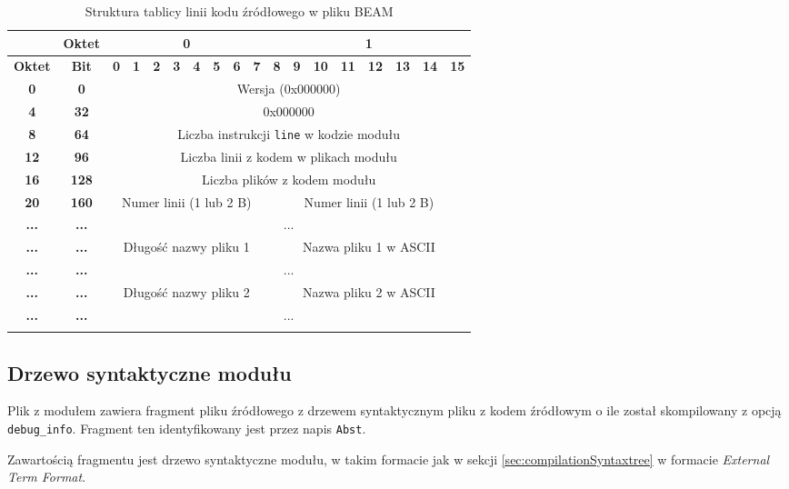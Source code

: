\begin{longtable}{|c|c|c|c|c|c|c|c|c|c|c|c|c|c|c|c|c|c|}
\hline
         & \textbf{Oktet} & \multicolumn{8}{|c|}{\textbf{0}} & \multicolumn{8}{|c|}{\textbf{1}} \\
\hline
\textbf{Oktet} & \textbf{Bit} & \textbf{0} & \textbf{1} & \textbf{2} & \textbf{3} & \textbf{4} & \textbf{5} & \textbf{6} & \textbf{7} & \textbf{8} & \textbf{9} & \textbf{10} & \textbf{11} & \textbf{12} & \textbf{13} & \textbf{14} & \textbf{15}\\
\hline
\textbf{0} & \textbf{0} & \multicolumn{16}{|c|}{Wersja (0x000000)} \\[3ex]
\hline
\textbf{4} & \textbf{32} & \multicolumn{16}{|c|}{0x000000}\\[3ex]
\hline
\textbf{8} & \textbf{64} & \multicolumn{16}{|c|}{Liczba instrukcji \texttt{line} w kodzie modułu} \\[3ex]
\hline
\textbf{12} & \textbf{96} & \multicolumn{16}{|c|}{Liczba linii z kodem w plikach modułu}\\[3ex]
\hline
\textbf{16} & \textbf{128} & \multicolumn{16}{|c|}{Liczba plików z kodem modułu}\\[3ex]
\hline
\textbf{20} & \textbf{160} & \multicolumn{8}{|c|}{Numer linii (1 lub 2 B)} & \multicolumn{8}{|c|}{Numer linii (1 lub 2 B)} \\[3ex]
\hline
\textbf{...} & \textbf{...} & \multicolumn{16}{|c|}{...}\\[3ex]
\hline
\textbf{...} & \textbf{...} & \multicolumn{8}{|c|}{Długość nazwy pliku 1} & \multicolumn{8}{|c|}{Nazwa pliku 1 w ASCII}\\[3ex]
\hline
\textbf{...} & \textbf{...} & \multicolumn{16}{|c|}{...}\\[3ex]
\hline
\textbf{...} & \textbf{...} & \multicolumn{8}{|c|}{Długość nazwy pliku 2} & \multicolumn{8}{|c|}{Nazwa pliku 2 w ASCII}\\[3ex]
\hline
\textbf{...} & \textbf{...} & \multicolumn{16}{|c|}{...}\\[3ex]
\hline
\caption{Struktura tablicy linii kodu źródłowego w pliku BEAM}
\label{table:linetable} \\
\end{longtable}

\subsection{Drzewo syntaktyczne modułu}
Plik z modułem zawiera fragment pliku źródłowego z drzewem syntaktycznym pliku z kodem źródłowym o ile został skompilowany z opcją \texttt{debug\_info}.
Fragment ten identyfikowany jest przez napis \texttt{Abst}. 

Zawartością fragmentu jest drzewo syntaktyczne modułu, w takim formacie jak w sekcji \ref{sec:compilationSyntaxtree} w formacie \emph{External Term Format}.

